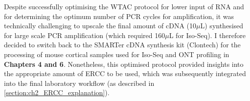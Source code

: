 Despite successfully optimising the WTAC protocol for lower input of RNA and for determining the optimum number of PCR cycles for amplification, it was technically challenging to upscale the final amount of cDNA (10$\mu$L) synthesised for large scale PCR amplification (which required 160$\mu$L for Iso-Seq). I therefore decided to switch back to the SMARTer cDNA synthesis kit (Clontech) for the processing of mouse cortical samples used for Iso-Seq and ONT profiling  in \textbf{Chapters 4 and 6}. Nonetheless, this optimised protocol provided insights into the appropriate amount of ERCC to be used, which was subsequently integrated into the final laboratory workflow (as described in \cref{section:ch2_ERCC_explanation}).  
\resumetocwriting

